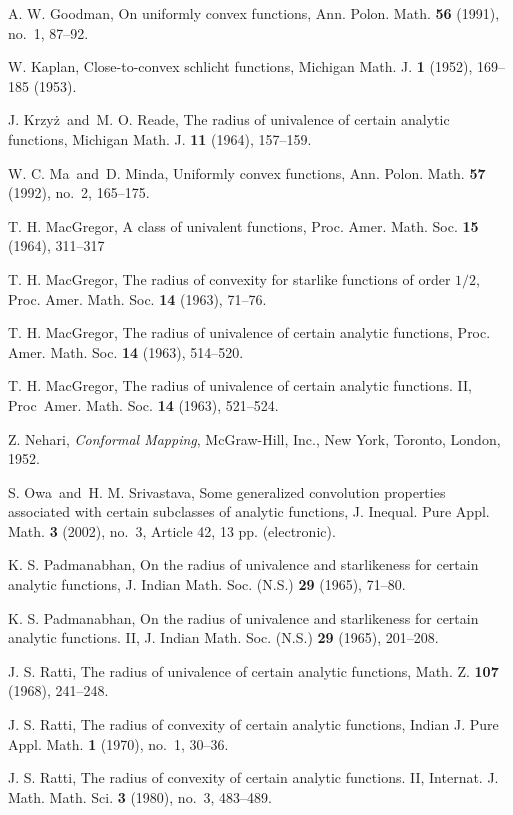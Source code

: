\documentclass{amsart}
\begin{document}
\begin{thebibliography}{99}
A. W. Goodman, On uniformly convex functions, Ann. Polon. Math. {\bf 56} (1991), no.~1, 87--92.

 W. Kaplan, Close-to-convex schlicht functions, Michigan Math. J. {\bf 1} (1952), 169--185 (1953).

 J. Krzy\.z\ and\ M. O. Reade, The radius of univalence of certain analytic functions, Michigan Math. J. {\bf 11} (1964), 157--159.

W. C. Ma\ and\ D. Minda, Uniformly convex functions, Ann. Polon. Math. {\bf 57} (1992), no.~2, 165--175.

T. H. MacGregor, A class of univalent functions, Proc. Amer. Math. Soc. {\bf 15} (1964), 311--317

  T. H. MacGregor, The radius of convexity for starlike functions of order ${1/2}$, Proc. Amer. Math. Soc. {\bf 14} (1963), 71--76.

 T. H. MacGregor, The radius of univalence of certain analytic functions, Proc. Amer. Math. Soc. {\bf 14} (1963), 514--520.

 T. H. MacGregor, The radius of univalence of certain analytic functions. II, Proc\ Amer. Math. Soc. {\bf 14} (1963), 521--524.

Z. Nehari, {\it Conformal Mapping}, McGraw-Hill, Inc., New York, Toronto, London, 1952.

 S. Owa\ and\ H. M. Srivastava, Some generalized convolution properties associated with certain subclasses of analytic functions, J. Inequal. Pure Appl. Math. {\bf 3} (2002), no.~3, Article 42, 13 pp. (electronic).

 K. S. Padmanabhan, On the radius of univalence and starlikeness for certain analytic functions, J. Indian Math. Soc. (N.S.) {\bf 29} (1965), 71--80.

 K. S. Padmanabhan, On the radius of univalence and starlikeness for certain analytic functions. II, J. Indian Math. Soc. (N.S.) {\bf 29} (1965), 201--208.

 J. S. Ratti, The radius of univalence of certain analytic functions, Math. Z. {\bf 107} (1968), 241--248. 

J. S. Ratti, The radius of convexity of certain analytic functions, Indian J. Pure Appl. Math. {\bf 1} (1970), no.~1, 30--36.

J. S. Ratti, The radius of convexity of certain analytic functions. II, Internat. J. Math. Math. Sci. {\bf 3} (1980), no.~3, 483--489.


\end{thebibliography}
\end{document}
